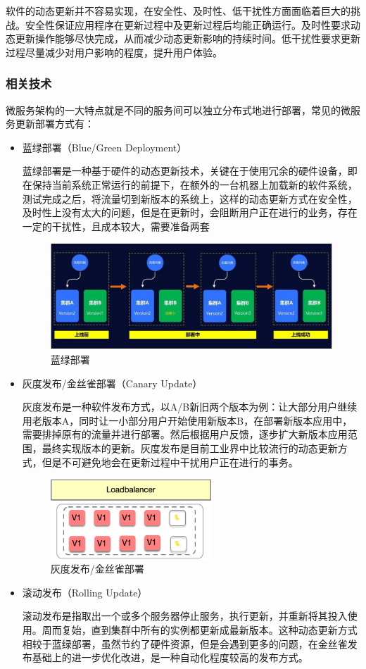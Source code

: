 \documentclass[a4paper, 12pt]{article}
\theoremstyle{definition}
\begin{document}
软件的动态更新并不容易实现，在安全性、及时性、低干扰性方面面临着巨大的挑战。安全性保证应用程序在更新过程中及更新过程后均能正确运行。及时性要求动态更新操作能够尽快完成，从而减少动态更新影响的持续时间。低干扰性要求更新过程尽量减少对用户影响的程度，提升用户体验。

\subsubsection{相关技术}
微服务架构的一大特点就是不同的服务间可以独立分布式地进行部署，常见的微服务更新部署方式有：
\begin{itemize}
	\item{蓝绿部署（Blue/Green Deployment）

	蓝绿部署是一种基于硬件的动态更新技术，关键在于使用冗余的硬件设备，即在保持当前系统正常运行的前提下，在额外的一台机器上加载新的软件系统，测试完成之后，将流量切到新版本的系统上，这样的动态更新方式在安全性，及时性上没有太大的问题，但是在更新时，会阻断用户正在进行的业务，存在一定的干扰性，且成本较大，需要准备两套}
	\begin{figure}[ht]
	 \centering
	 \includegraphics[height=4cm]{images/blue-green.jpeg}
	 \caption{蓝绿部署}
	 \label{fig:blue-green}
	\end{figure}

	\item{灰度发布/金丝雀部署（Canary Update）

	灰度发布是一种软件发布方式，以A/B新旧两个版本为例：让大部分用户继续用老版本A，同时让一小部分用户开始使用新版本B，在部署新版本应用中，需要排掉原有的流量并进行部署。然后根据用户反馈，逐步扩大新版本应用范围，最终实现版本的更新。灰度发布是目前工业界中比较流行的动态更新方式，但是不可避免地会在更新过程中干扰用户正在进行的事务。}
	\begin{figure}[ht]
	 \centering
	 \includegraphics[height=3cm]{images/canary.png}
	 \caption{灰度发布/金丝雀部署}
	 \label{fig:canary}
	\end{figure}

	\item{滚动发布（Rolling Update）

	滚动发布是指取出一个或多个服务器停止服务，执行更新，并重新将其投入使用。周而复始，直到集群中所有的实例都更新成最新版本。这种动态更新方式相较于蓝绿部署，虽然节约了硬件资源，但是会遇到更多的问题，在金丝雀发布基础上的进一步优化改进，是一种自动化程度较高的发布方式。}
	
\end{itemize}
\end{document}
